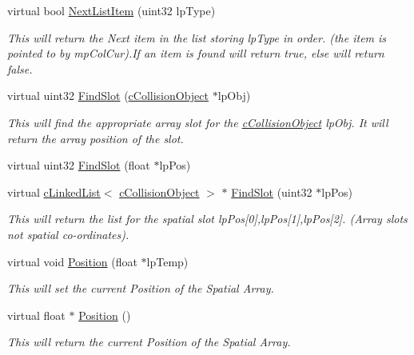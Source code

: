 \begin{DoxyCompactItemize}
virtual bool \hyperlink{classc_collision_handler_a58b636db8343b7f4bbb27f3a93799e8b}{NextListItem} (uint32 lpType)
\begin{DoxyCompactList}\small\item\em This will return the Next item in the list storing lpType in order. (the item is pointed to by mpColCur).If an item is found will return true, else will return false. \item\end{DoxyCompactList}\item 
virtual uint32 \hyperlink{classc_collision_handler_ad2b079e234f956301fe83f5a5938cad0}{FindSlot} (\hyperlink{classc_collision_object}{cCollisionObject} $\ast$lpObj)
\begin{DoxyCompactList}\small\item\em This will find the appropriate array slot for the \hyperlink{classc_collision_object}{cCollisionObject} lpObj. It will return the array position of the slot. \item\end{DoxyCompactList}\item 
virtual uint32 \hyperlink{classc_collision_handler_ae5b521293de0e9e2779a857753dbab6f}{FindSlot} (float $\ast$lpPos)
\item 
virtual \hyperlink{classc_linked_list}{cLinkedList}$<$ \hyperlink{classc_collision_object}{cCollisionObject} $>$ $\ast$ \hyperlink{classc_collision_handler_aa6f7ca9d10b078ba11fcc3c0d266ab8e}{FindSlot} (uint32 $\ast$lpPos)
\begin{DoxyCompactList}\small\item\em This will return the list for the spatial slot lpPos\mbox{[}0\mbox{]},lpPos\mbox{[}1\mbox{]},lpPos\mbox{[}2\mbox{]}. (Array slots not spatial co-\/ordinates). \item\end{DoxyCompactList}\item 
virtual void \hyperlink{classc_collision_handler_aae512b7a5c7abb7307e7d25f22aa9fd0}{Position} (float $\ast$lpTemp)
\begin{DoxyCompactList}\small\item\em This will set the current Position of the Spatial Array. \item\end{DoxyCompactList}\item 
virtual float $\ast$ \hyperlink{classc_collision_handler_af02385e0c91e4c73c521e65477efed2c}{Position} ()
\begin{DoxyCompactList}\small\item\em This will return the current Position of the Spatial Array. \item\end{DoxyCompactList}\end{DoxyCompactItemize}

